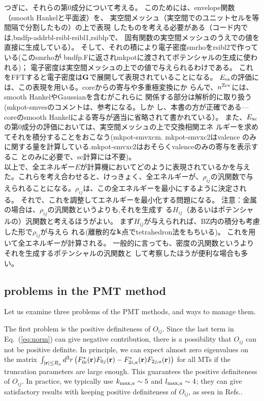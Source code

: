 \documentclass[twocolumn,showpacs,preprintnumbers,amsmath,amssymb,floatfix]{revtex4-1}
\newcommand{\bfk}{{\bf k}}
\newcommand{\bfr}{{\bf r}}
\newcommand{\bfG}{{\bf G}}
\newcommand{\req}[1]{\mbox{Eq.~\!(\ref{#1})}}
\def\nzcv{n^{\rm Zcv}}
\def\intaa{\int_{|\bfr|\leq R_a}}
\begin{document}
つぎに、それらの第0成分について考える。
このためには、envelope関数（smooth Hankelと平面波）を、
実空間メッシュ（実空間でのユニットセルを等間隔で分割したもの）の上で表現
したものを考える必要がある（コード内では,bndfp-addrbl-rsibl-rsibl1,rsiblpで、
固有関数の実空間メッシュのうえでの値を直接に生成している）。
そして、それの積により電子密度smrhoをrsibl2で作っている(このsmrhoが
bndfp.Fに返されmkpotに渡されてポテンシャルの生成に使われる)；
電子密度は実空間メッシュの上での値で与えられるわけである。
これをFFTすると電子密度は$\bfG$で展開して表現されていることになる。
$E_{\rm es}$の評価には、この表現を用いる。coreからの寄与や多重極変換にか
らんで、$\nzcv$には、smooth HankelやGaussianを含むがこれらに
関係する部分は解析的に取り扱う(mkpot-smvesのコメントは、参考になる。しか
し、本書の方が正確である---coreのsmooth Hankelによる寄与が適当に省略されて書かれている）。
また、$E_{\rm xc}$の第0成分の評価においては、実空間メッシュの上で交換相関エネ
ルギーを求めてそれを積分することをおこなう(mkpot-smvxcm. mkpot-smvxc2はvalence
のみに関する量を計算している.mkpot-smvxc2はおそらくvalenceのみの寄与を表示するこ
とのみに必要で、sc計算には不要)。\\

以上で、全エネルギー$E$が計算機においてどのように表現されているかを与え
た。これらを考え合わせると、けっきょく、全エネルギーが、$\rho_{ij}$の汎関数で与
えられることになる。$\rho_{ij}$は、この全エネルギーを最小にするように決定される。
それで、これを調整してエネルギーを最小化する問題になる。
{\small 注意：金属の場合は、$\rho_{ij}$の汎関数というよりも,それを生成す
る$H_{ij}$（あるいはポテンシャルの）汎関数と考えるほうがよい。
まず$H_{ij}$が与えられれば、BZ内の積分も考慮した形で$\rho_{ij}$が与えら
れる(離散的な$\bfk$点でtetrahedron法をもちいる)。
これを用いて全エネルギーが計算される。
一般的に言っても、密度の汎関数というよりそれを生成するポテンシャルの汎関数と
して考察したほうが便利な場合も多い。}

\subsection{problems in the PMT method}
\label{sec:problems}
Let us examine three problems of the PMT methods, and ways to
manage them.

The first problem is the positive definiteness of $O_{ij}$.
Since the last term in \req{eq:norm} can give negative contribution,
there is a possibility that $O_{ij}$ can not be positive definite.
In principle, we can expect almost zero eigenvalues on the matrix
$\intaa d^3r \left(F^*_{0i}(\bfr)F_{0j}(\bfr)-F^*_{2i,a}(\bfr)F_{2j,a}(\bfr)\right)$ 
for all MTs if the truncation parameters are large enough. 
This guarantees the positive definiteness of $O_{ij}$.
In practice, we typically use $k_{{\rm max},a} \sim 5$ 
and $l_{{\rm max},a}\sim 4$; they
can give satisfactory results with keeping positive
definiteness of $O_{ij}$, as seen in Refs.\cite{pmt1,kotani_linearized_2013}.
\end{document}
